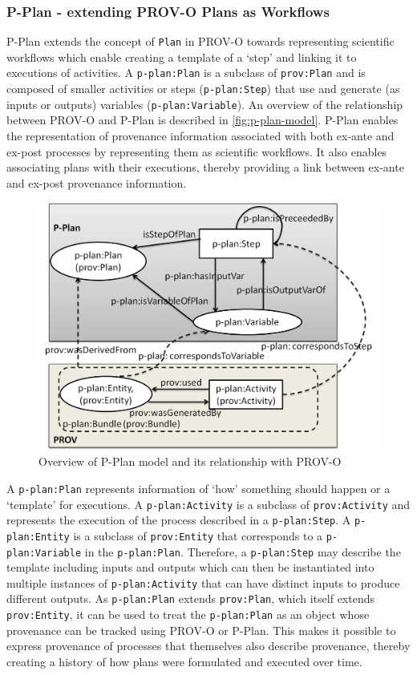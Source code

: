 \subsubsection{P-Plan - extending PROV-O Plans as Workflows}
P-Plan \cite{garijo_p-plan_2014} extends the concept of \texttt{Plan} in PROV-O towards representing scientific
workflows which enable creating a template of a `step' and linking it to executions of activities.
A \texttt{p-plan:Plan} is a subclass of \texttt{prov:Plan} and is composed of smaller activities or steps (\texttt{p-plan:Step}) that use and generate (as inputs or outputs) variables (\texttt{p-plan:Variable}).
An overview of the relationship between PROV-O and P-Plan is described in \autoref{fig:p-plan-model}.
P-Plan enables the representation of provenance information associated with both ex-ante and ex-post processes by representing them as scientific workflows. It also enables associating plans with their executions, thereby providing a link between ex-ante and ex-post provenance information.
\begin{figure}[htbp]
    \centering
    \includegraphics[width=0.75\linewidth]{img/p-plan-model.png}
    \caption{Overview of P-Plan model and its relationship with PROV-O \cite{garijo_p-plan_2014}}
    \label{fig:p-plan-model}
\end{figure}

A \texttt{p-plan:Plan} represents information of `how’ something should happen or a `template’ for executions. A \texttt{p-plan:Activity} is a subclass of \texttt{prov:Activity} and represents the execution of the process described in a \texttt{p-plan:Step}.
A \texttt{p-plan:Entity} is a subclass of \texttt{prov:Entity} that corresponds to a \texttt{p-plan:Variable} in the \texttt{p-plan:Plan}. Therefore, a
\texttt{p-plan:Step} may describe the template including inputs and outputs which can
then be instantiated into multiple instances of \texttt{p-plan:Activity} that can have
distinct inputs to produce different outputs.
As \texttt{p-plan:Plan} extends \texttt{prov:Plan}, which itself extends \texttt{prov:Entity}, it can be
used to treat the \texttt{p-plan:Plan} as an object whose provenance can be tracked using
PROV-O or P-Plan. This makes it possible to express provenance of processes that themselves also describe provenance, thereby creating a history of how plans were formulated and executed over time.

